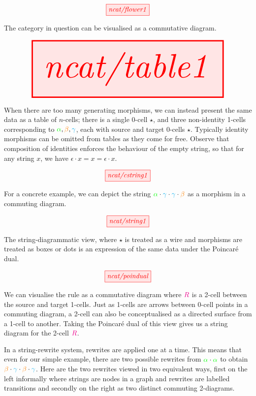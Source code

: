 \begin{marginfigure}[10cm]
\centering
\[\tikzfig{ncat/flower1}\]
\caption{The category in question can be visualised as a commutative diagram.}
\end{marginfigure}

\begin{marginfigure}
\centering
\[\resizebox{\textwidth}{!}{\tikzfig{ncat/table1}}\]
\caption{When there are too many generating morphisms, we can instead present the same data as a table of $n$-cells; there is a single 0-cell $\star$, and three non-identity 1-cells corresponding to $\textcolor{green}{\alpha}, \textcolor{orange}{\beta}, \textcolor{cyan}{\gamma}$, each with source and target 0-cells $\star$. Typically identity morphisms can be omitted from tables as they come for free. Observe that composition of identities enforces the behaviour of the empty string, so that for any string $x$, we have $\epsilon \cdot x = x = \epsilon \cdot x$.}
\end{marginfigure}

\begin{marginfigure}
\centering
\[\tikzfig{ncat/cstring1}\]
\caption{For a concrete example, we can depict the string $\textcolor{green}{\alpha} \cdot \textcolor{cyan}{\gamma} \cdot \textcolor{cyan}{\gamma} \cdot \textcolor{orange}{\beta}$ as a morphism in a commuting diagram.}
\end{marginfigure}

\begin{marginfigure}
\centering
\[\tikzfig{ncat/string1}\]
\caption{The string-diagrammatic view, where $\star$ is treated as a wire and morphisms are treated as boxes or dots is an expression of the same data under the Poincar\'{e} dual.}
\end{marginfigure}

\begin{marginfigure}\label{fig:ruleR}
\centering
\[\tikzfig{ncat/poindual}\]
\caption{We can visualise the rule as a commutative diagram where $\textcolor{magenta}{R}$ is a 2-cell between the source and target 1-cells. Just as 1-cells are arrows between 0-cell points in a commuting diagram, a 2-cell can also be conceptualised as a directed surface from a 1-cell to another. Taking the Poincar\'{e} dual of this view gives us a string diagram for the 2-cell $\textcolor{magenta}{R}$.}
\end{marginfigure}

 In a string-rewrite system, rewrites are applied one at a time. This means that even for our simple example, there are two possible rewrites from $\textcolor{green}{\alpha} \cdot \textcolor{green}{\alpha}$ to obtain $\textcolor{orange}{\beta} \cdot \textcolor{cyan}{\gamma} \cdot \textcolor{orange}{\beta} \cdot \textcolor{cyan}{\gamma}$. Here are the two rewrites viewed in two equivalent ways, first on the left informally where strings are nodes in a graph and rewrites are labelled transitions and secondly on the right as two distinct commuting 2-diagrams.

